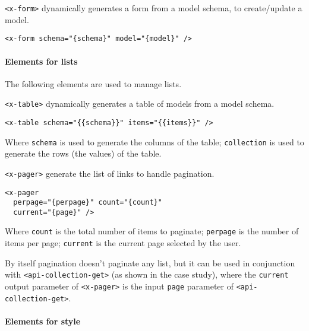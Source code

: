 \vspace{0.2cm}

\texttt{<x-form>}  dynamically generates a form from a model schema, to create/update a model.

\begin{lstlisting}[language=HTML5]
<x-form schema="{schema}" model="{model}" />
\end{lstlisting}

\paragraph{Elements for lists}

The following elements are used to manage lists. 

\vspace{0.2cm}

\texttt{<x-table>}  dynamically generates a table of models from a model schema. 

\begin{lstlisting}[language=HTML5]
<x-table schema="{{schema}}" items="{{items}}" />
\end{lstlisting}

Where \texttt{schema} is used to generate the columns of the table; 
\texttt{collection} is used to generate the rows (the values) of the table.

\vspace{0.2cm}

\texttt{<x-pager>} generate the list of links to handle pagination.

\begin{lstlisting}[language=HTML5]
<x-pager 
  perpage="{perpage}" count="{count}" 
  current="{page}" />
\end{lstlisting}

Where \texttt{count} is the total number of items to paginate; 
\texttt{perpage} is the number of items per page; 
\texttt{current} is the current page selected by the user.

By itself pagination doesn't paginate any list, but it can be used in conjunction with \texttt{<api-collection-get>} (as shown in the case study), where the \texttt{current} output parameter of \texttt{<x-pager>} is the input \texttt{page} parameter of \texttt{<api-collection-get>}.

\paragraph{Elements for style}


